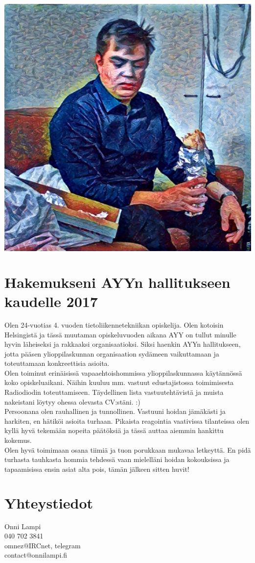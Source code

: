 \documentclass[a4paper, 12pt, finnish]{report}
\newcommand{\topic}{Hakemukseni AYYn hallitukseen kaudelle 2017}
\begin{document}
\includegraphics{Onni.jpg}
\section*{\topic}
Olen 24-vuotias 4. vuoden tietoliikennetekniikan opiskelija.
Olen kotoisin Helsingistä ja tässä muutaman opiskeluvuoden aikana AYY on tullut minulle hyvin läheiseksi ja rakkaaksi organisaatioksi.
Siksi haenkin AYYn hallitukseen, jotta pääsen ylioppilaskunnan organisaation sydämeen vaikuttamaan ja toteuttamaan konkreettisia asioita.\\

Olen toiminut erinäisissä vapaaehtoishommissa ylioppilaskunnassa käytännössä koko opiskeluaikani.
Näihin kuuluu mm. vastuut edustajistossa toimimisesta Radiodiodin toteuttamiseen.
Täydellinen lista vastuutehtävistä ja muista nakeistani löytyy ohessa olevasta CV:stäni. :)\\

Persoonana olen rauhallinen ja tunnollinen.
Vastuuni hoidan jämäkästi ja harkiten, en hätiköi asioita turhaan.
Pikaista reagointia vaativissa tilanteissa olen kyllä hyvä tekemään nopeita päätöksiä ja tässä auttaa aiemmin hankittu kokemus.\\

Olen hyvä toimimaan osana tiimiä ja tuon porukkaan mukavaa letkeyttä.
En pidä turhasta tauhkasta hommia tehdessä vaan mielelläni hoidan kokouksissa ja tapaamisissa ensin asiat alta pois, tämän jälkeen sitten huvit!


\section*{Yhteystiedot}
Onni Lampi\\
040 702 3841\\
omnez@IRCnet, telegram\\
contact@onnilampi.fi
\end{document}
